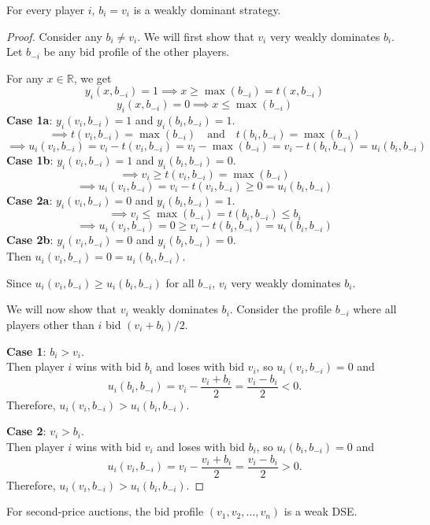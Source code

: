 \begin{lemma}
For every player $i$, $b_i = v_i$ is a weakly dominant strategy.
\end{lemma}
\begin{proof}
Consider any $b_i \neq v_i$.
We will first show that $v_i$ very weakly dominates $b_i$.
Let $b_{-i}$ be any bid profile of the other players.

For any $x \in \mathbb{R}$, we get
\[ y_i(x, b_{-i}) = 1 \implies x \ge \max(b_{-i}) = t(x, b_{-i}) \]
\[ y_i(x, b_{-i}) = 0 \implies x \le \max(b_{-i}) \]
\textbf{Case 1a}: $y_i(v_i, b_{-i}) = 1$ and $y_i(b_i, b_{-i}) = 1$.
\[ \implies t(v_i, b_{-i}) = \max(b_{-i})
\quad\textrm{and}\quad t(b_i, b_{-i}) = \max(b_{-i}) \]
\[ \implies u_i(v_i, b_{-i}) = v_i - t(v_i, b_{-i}) = v_i - \max(b_{-i})
    = v_i - t(b_i, b_{-i}) = u_i(b_i, b_{-i}) \]
\textbf{Case 1b}: $y_i(v_i, b_{-i}) = 1$ and $y_i(b_i, b_{-i}) = 0$.
\[ \implies v_i \ge t(v_i, b_{-i}) = \max(b_{-i}) \]
\[ \implies u_i(v_i, b_{-i}) = v_i - t(v_i, b_{-i}) \ge 0 = u_i(b_i, b_{-i}) \]
\textbf{Case 2a}: $y_i(v_i, b_{-i}) = 0$ and $y_i(b_i, b_{-i}) = 1$.
\[ \implies v_i \le \max(b_{-i}) = t(b_i, b_{-i}) \le b_i \]
\[ \implies u_i(v_i, b_{-i}) = 0 \ge v_i - t(b_i, b_{-i}) = u_i(b_i, b_{-i}) \]
\textbf{Case 2b}: $y_i(v_i, b_{-i}) = 0$ and $y_i(b_i, b_{-i}) = 0$.\\
Then $u_i(v_i, b_{-i}) = 0 = u_i(b_i, b_{-i})$.

Since $u_i(v_i, b_{-i}) \ge u_i(b_i, b_{-i})$ for all $b_{-i}$,
$v_i$ very weakly dominates $b_i$.

We will now show that $v_i$ weakly dominates $b_i$.
Consider the profile $b_{-i}$ where all players other than $i$ bid $(v_i + b_i) / 2$.

\textbf{Case 1}: $b_i > v_i$.\\
Then player $i$ wins with bid $b_i$ and loses with bid $v_i$,
so $u_i(v_i, b_{-i}) = 0$ and
\[ u_i(b_i, b_{-i}) = v_i - \frac{v_i + b_i}{2} = \frac{v_i - b_i}{2} < 0. \]
Therefore, $u_i(v_i, b_{-i}) > u_i(b_i, b_{-i})$.

\textbf{Case 2}: $v_i > b_i$.\\
Then player $i$ wins with bid $v_i$ and loses with bid $b_i$,
so $u_i(b_i, b_{-i}) = 0$ and
\[ u_i(v_i, b_{-i}) = v_i - \frac{v_i + b_i}{2} = \frac{v_i - b_i}{2} > 0. \]
Therefore, $u_i(v_i, b_{-i}) > u_i(b_i, b_{-i})$.
\end{proof}

\begin{corollary}
For second-price auctions, the bid profile $(v_1, v_2, \ldots, v_n)$ is a weak DSE.
\end{corollary}


